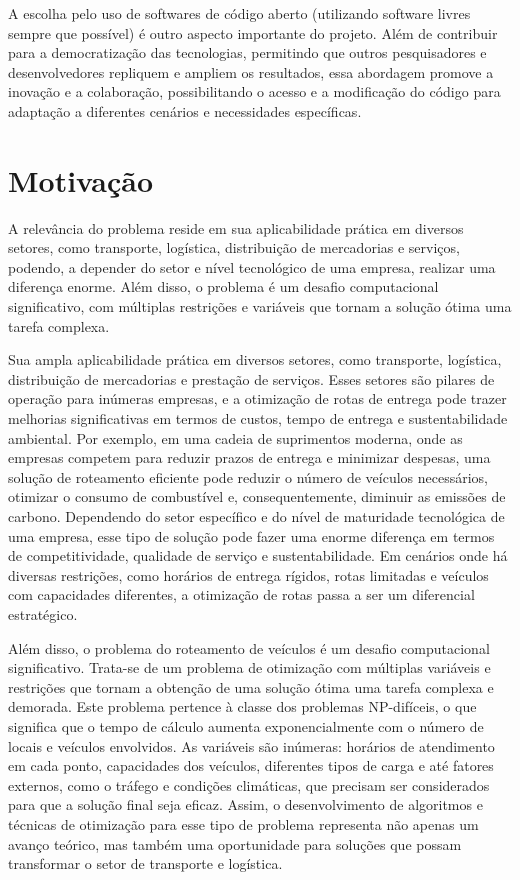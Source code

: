 \documentclass[
    openany,
    12pt,
    a4paper,
    twoside,
    english,
    brazil, sumario=tradicional
]{/home/lucas_galdino/Desktop/TCC/planning/abntex2/abntex2}
\let\oldchapter\chapter
\renewcommand{\chapter}{\clearpage\oldchapter}
\begin{document}
A escolha pelo uso de softwares de código aberto (utilizando software livres sempre que possível) é outro aspecto importante do projeto. Além de contribuir para a democratização das tecnologias, 
permitindo que outros pesquisadores e desenvolvedores repliquem e ampliem os resultados, essa abordagem promove a inovação e a colaboração, 
possibilitando o acesso e a modificação do código para adaptação a diferentes cenários e necessidades específicas.


\chapter{Motivação}

A relevância do problema reside em sua aplicabilidade prática em diversos setores, como transporte, logística, distribuição de mercadorias e serviços,
podendo, a depender do setor e nível tecnológico de uma empresa, realizar uma diferença enorme. Além disso, o problema é um desafio computacional
significativo, com múltiplas restrições e variáveis que tornam a solução ótima uma tarefa complexa.

Sua ampla aplicabilidade prática em diversos setores, como transporte, logística, 
distribuição de mercadorias e prestação de serviços. Esses setores são pilares de operação para inúmeras empresas, e a 
otimização de rotas de entrega pode trazer melhorias significativas em termos de custos, tempo de entrega e sustentabilidade 
ambiental. Por exemplo, em uma cadeia de suprimentos moderna, onde as empresas competem para reduzir prazos de entrega e minimizar 
despesas, uma solução de roteamento eficiente pode reduzir o número de veículos necessários, otimizar o consumo de combustível e, 
consequentemente, diminuir as emissões de carbono. Dependendo do setor específico e do nível de maturidade tecnológica de uma empresa, 
esse tipo de solução pode fazer uma enorme diferença em termos de competitividade, qualidade de serviço e sustentabilidade. Em cenários 
onde há diversas restrições, como horários de entrega rígidos, rotas limitadas e veículos com capacidades diferentes, a otimização de 
rotas passa a ser um diferencial estratégico.

Além disso, o problema do roteamento de veículos é um desafio computacional significativo. Trata-se de um problema de 
otimização com múltiplas variáveis e restrições que tornam a obtenção de uma solução ótima uma tarefa complexa e demorada. 
Este problema pertence à classe dos problemas NP-difíceis, o que significa que o tempo de cálculo aumenta exponencialmente 
com o número de locais e veículos envolvidos. As variáveis são inúmeras: horários de atendimento em cada ponto, capacidades 
dos veículos, diferentes tipos de carga e até fatores externos, como o tráfego e condições climáticas, que precisam ser 
considerados para que a solução final seja eficaz. Assim, o desenvolvimento de algoritmos e técnicas de otimização para 
esse tipo de problema representa não apenas um avanço teórico, mas também uma oportunidade para soluções que possam transformar 
o setor de transporte e logística.
\end{document}
